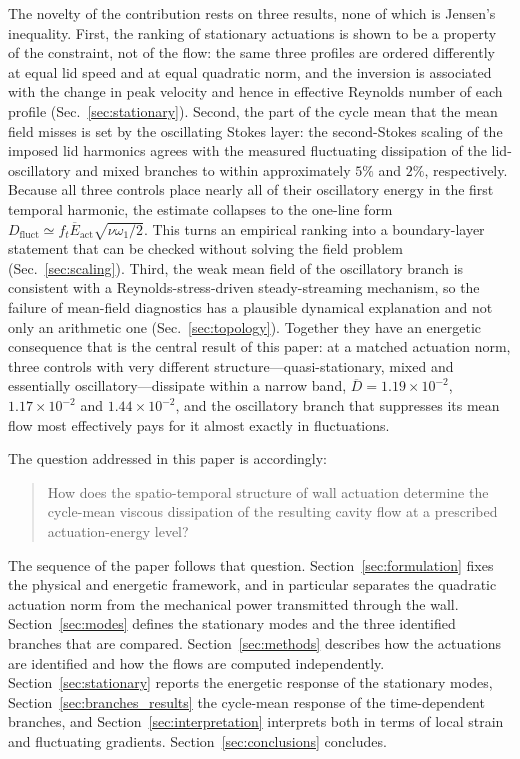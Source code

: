 \documentclass[11pt,a4paper]{article}
\newenvironment{chgadd}{\par\color{blue}}{\par\color{black}}
\begin{document}
\begin{chgadd}
The novelty of the contribution rests on three results, none of which is
Jensen's inequality. First, the ranking of stationary actuations is shown to be a
property of the constraint, not of the flow: the same three profiles are ordered
differently at equal lid speed and at equal quadratic norm, and the inversion is
associated with the change in peak velocity and hence in effective Reynolds number
of each profile (Sec.~\ref{sec:stationary}). Second, the part of the cycle mean
that the mean field misses is set by the oscillating Stokes layer: the
second-Stokes scaling of the imposed lid harmonics agrees with the measured
fluctuating dissipation of the lid-oscillatory and mixed branches to within
approximately $5\%$ and $2\%$, respectively. Because
all three controls place nearly all of their oscillatory energy in the first
temporal harmonic, the estimate collapses to the one-line form
$D_{\mathrm{fluct}}\simeq f_t\overline{E}_{\mathrm{act}}\sqrt{\nu\omega_1/2}$.
This turns an empirical ranking into a boundary-layer statement that can be
checked without solving the field problem (Sec.~\ref{sec:scaling}). Third, the weak
mean field of the oscillatory branch is
consistent with a Reynolds-stress-driven steady-streaming mechanism, so the failure
of mean-field diagnostics has a plausible dynamical explanation and not only an
arithmetic one (Sec.~\ref{sec:topology}).
Together they have an energetic consequence that is the central
result of this paper: at a matched actuation norm, three controls with very
different structure---quasi-stationary, mixed and essentially oscillatory---dissipate
within a narrow band, $\overline{D}=1.19\times10^{-2}$, $1.17\times10^{-2}$ and
$1.44\times10^{-2}$, and the oscillatory branch that suppresses its mean flow most
effectively pays for it almost exactly in fluctuations.
\end{chgadd}

The question addressed in this paper is accordingly:
\begin{quote}
How does the spatio-temporal structure of wall actuation determine the cycle-mean
viscous dissipation of the resulting cavity flow at a prescribed
actuation-energy level?
\end{quote}
The sequence of the paper follows that question. Section~\ref{sec:formulation}
fixes the physical and energetic framework, and in particular separates the
quadratic actuation norm from the mechanical power transmitted through the wall.
Section~\ref{sec:modes} defines the stationary modes and the three identified
branches that are compared. Section~\ref{sec:methods} describes how the
actuations are identified and how the flows are computed independently.
Section~\ref{sec:stationary} reports the energetic response of the stationary
modes, Section~\ref{sec:branches_results} the cycle-mean response of the time-dependent
branches, and Section~\ref{sec:interpretation} interprets both in terms of local
strain and fluctuating gradients. Section~\ref{sec:conclusions} concludes.
\end{document}
